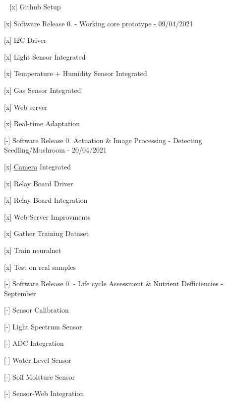 ~\newline
 \mbox{[}x\mbox{]} Github Setup

\mbox{[}x\mbox{]} Software Release 0. -\/ Working core prototype -\/ 09/04/2021
\begin{DoxyItemize}
\item \mbox{[}x\mbox{]} I2C Driver
\item \mbox{[}x\mbox{]} Light Sensor Integrated
\item \mbox{[}x\mbox{]} Temperature + Humidity Sensor Integrated
\item \mbox{[}x\mbox{]} Gas Sensor Integrated
\item \mbox{[}x\mbox{]} Web server
\item \mbox{[}x\mbox{]} Real-\/time Adaptation
\end{DoxyItemize}

\mbox{[}-\/\mbox{]} Software Release 0. Actuation \& Image Processing -\/ Detecting Seedling/\+Mushroom -\/ 20/04/2021
\begin{DoxyItemize}
\item \mbox{[}x\mbox{]} \hyperlink{classCamera}{Camera} Integrated
\item \mbox{[}x\mbox{]} Relay Board Driver
\item \mbox{[}x\mbox{]} Relay Board Integration
\item \mbox{[}x\mbox{]} Web-\/\+Server Improvments
\item \mbox{[}x\mbox{]} Gather Training Dataset
\item \mbox{[}x\mbox{]} Train neuralnet
\item \mbox{[}x\mbox{]} Test on real samples
\end{DoxyItemize}

\mbox{[}-\/\mbox{]} Software Release 0. -\/ Life cycle Assessment \& Nutrient Defficiencies -\/ September
\begin{DoxyItemize}
\item \mbox{[}-\/\mbox{]} Sensor Calibration
\item \mbox{[}-\/\mbox{]} Light Spectrum Sensor
\item \mbox{[}-\/\mbox{]} A\+DC Integration
\item \mbox{[}-\/\mbox{]} Water Level Sensor
\item \mbox{[}-\/\mbox{]} Soil Moisture Sensor
\item \mbox{[}-\/\mbox{]} Sensor-\/\+Web Integration ~\newline
 
\end{DoxyItemize}